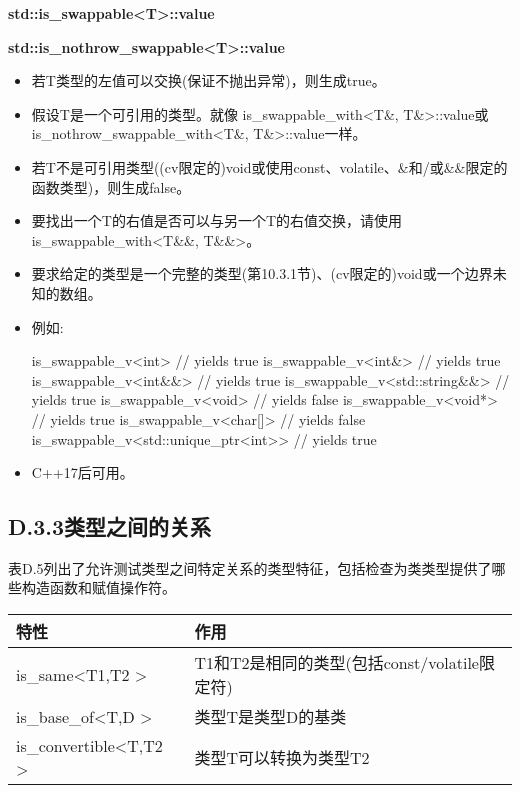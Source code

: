 \textbf{std::is\_swappable<T>::value}

\textbf{std::is\_nothrow\_swappable<T>::value}

\begin{itemize}
\item
若T类型的左值可以交换(保证不抛出异常)，则生成true。

\item
假设T是一个可引用的类型。就像 is\_swappable\_with<T\&, T\&>::value或is\_nothrow\_swappable\_with<T\&, T\&>::value一样。

\item
若T不是可引用类型((cv限定的)void或使用const、volatile、\&和/或\&\&限定的函数类型)，则生成false。

\item
要找出一个T的右值是否可以与另一个T的右值交换，请使用is\_swappable\_with<T\&\&, T\&\&>。

\item
要求给定的类型是一个完整的类型(第10.3.1节)、(cv限定的)void或一个边界未知的数组。

\item
例如:
\begin{cpp}
is_swappable_v<int> // yields true
is_swappable_v<int&> // yields true
is_swappable_v<int&&> // yields true
is_swappable_v<std::string&&> // yields true
is_swappable_v<void> // yields false
is_swappable_v<void*> // yields true
is_swappable_v<char[]> // yields false
is_swappable_v<std::unique_ptr<int>> // yields true
\end{cpp}

\item
C++17后可用。
\end{itemize}

\subsection{D.3.3\hspace{0.2cm}类型之间的关系}

表D.5列出了允许测试类型之间特定关系的类型特征，包括检查为类类型提供了哪些构造函数和赋值操作符。

\begin{table}[H]
	\begin{center}
	\begin{tabular}{l|l}
		\hline
		\textbf{特性}                                & \textbf{作用}                                                    \\ \hline
		is\_same\textless{}T1,T2 \textgreater{}       & T1和T2是相同的类型(包括const/volatile限定符)\\ \hline
		is\_base\_of\textless{}T,D \textgreater{}     & 类型T是类型D的基类                                     \\ \hline
		is\_convertible\textless{}T,T2 \textgreater{} & 类型T可以转换为类型T2                                 \\ \hline
	\end{tabular}
	\end{center}
\end{table}

